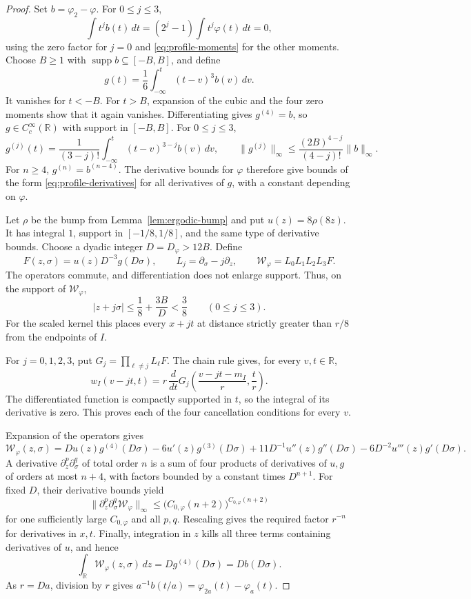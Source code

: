 \begin{proof}
Set \(b=\varphi_2-\varphi\).  For \(0\leq j\leq3\),
\[
 \int t^jb(t)\,dt=(2^j-1)\int t^j\varphi(t)\,dt=0,
\]
using the zero factor for \(j=0\) and \eqref{eq:profile-moments} for
the other moments.  Choose \(B\geq1\) with
\(\operatorname{supp}b\subseteq[-B,B]\), and define
\[
 g(t)=\frac16\int_{-\infty}^t(t-v)^3b(v)\,dv.
\]
It vanishes for \(t<-B\).  For \(t>B\), expansion of the cubic and the
four zero moments show that it again vanishes.  Differentiating gives
\(g^{(4)}=b\), so \(g\in C_c^\infty(\mathbb R)\) with support in
\([-B,B]\).  For \(0\leq j\leq3\),
\[
 g^{(j)}(t)=\frac1{(3-j)!}\int_{-\infty}^t(t-v)^{3-j}b(v)\,dv,
 \qquad
 \|g^{(j)}\|_\infty
       \leq\frac{(2B)^{4-j}}{(4-j)!}\|b\|_\infty.
\]
For \(n\geq4\), \(g^{(n)}=b^{(n-4)}\).  The derivative bounds for
\(\varphi\) therefore give bounds of the form
\eqref{eq:profile-derivatives} for all derivatives of \(g\), with a
constant depending on \(\varphi\).

Let \(\rho\) be the bump from Lemma~\ref{lem:ergodic-bump} and put
\(u(z)=8\rho(8z)\).  It has integral \(1\), support in \([-1/8,1/8]\),
and the same type of derivative bounds.  Choose a dyadic integer
\(D=D_\varphi>12B\).  Define
\[
 F(z,\sigma)=u(z)D^{-3}g(D\sigma),\qquad
 L_j=\partial_\sigma-j\partial_z,\qquad
 \mathcal W_\varphi=L_0L_1L_2L_3F.
\]
The operators commute, and differentiation does not enlarge support.
Thus, on the support of \(\mathcal W_\varphi\),
\[
 |z+j\sigma|\leq\frac18+\frac{3B}{D}<\frac38
       \qquad(0\leq j\leq3).
\]
For the scaled kernel this places every \(x+jt\) at distance strictly
greater than \(r/8\) from the endpoints of \(I\).

For \(j=0,1,2,3\), put \(G_j=\prod_{\ell\neq j}L_\ell F\).  The chain
rule gives, for every \(v,t\in\mathbb R\),
\[
 w_I(v-jt,t)
   =r\,\frac{d}{dt}
       G_j\left(\frac{v-jt-m_I}{r},\frac{t}{r}\right).
\]
The differentiated function is compactly supported in \(t\), so the
integral of its derivative is zero.  This proves each of the four
cancellation conditions for every \(v\).

Expansion of the operators gives
\[
 \mathcal W_\varphi(z,\sigma)
   =D u(z)g^{(4)}(D\sigma)-6u'(z)g^{(3)}(D\sigma)
      +11D^{-1}u''(z)g''(D\sigma)-6D^{-2}u'''(z)g'(D\sigma).
\]
A derivative \(\partial_z^p\partial_\sigma^q\) of total order \(n\)
is a sum of four products of derivatives of \(u,g\) of orders at most
\(n+4\), with factors bounded by a constant times \(D^{n+1}\).
For fixed \(D\), their derivative bounds yield
\[
 \|\partial_z^p\partial_\sigma^q\mathcal W_\varphi\|_\infty
   \leq\bigl(C_{0,\varphi}(n+2)\bigr)^{C_{0,\varphi}(n+2)}
\]
for one sufficiently large \(C_{0,\varphi}\) and all \(p,q\).
Rescaling gives the required factor \(r^{-n}\) for derivatives in
\(x,t\).  Finally, integration in \(z\) kills all three terms containing
derivatives of \(u\), and hence
\[
 \int_{\mathbb R}\mathcal W_\varphi(z,\sigma)\,dz
       =Dg^{(4)}(D\sigma)=Db(D\sigma).
\]
As \(r=Da\), division by \(r\) gives
\(a^{-1}b(t/a)=\varphi_{2a}(t)-\varphi_a(t)\).
\end{proof}

